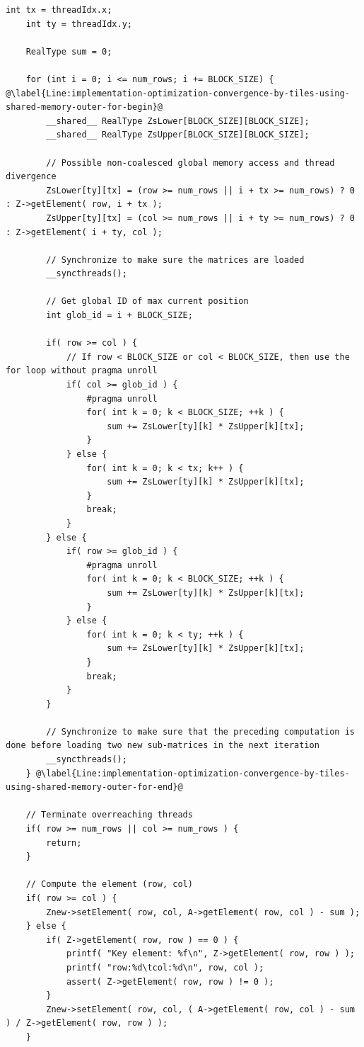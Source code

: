 \begin{lstlisting}[caption={Calculation of a single iteration of the GPU Iterative Crout method using logic from Listing~\ref{Listing:CUDA-matrix-multiplication-with-shared-memory-example}. Taken from the Decomposition project repository on GitLab\protect\footref{Footnote:decomposition-project-gitlab-url}.},label={Listing:implementation-optimization-convergence-by-tiles-using-shared-memory},escapechar=@]
	int tx = threadIdx.x;
	int ty = threadIdx.y;
	
	RealType sum = 0;
	
	for (int i = 0; i <= num_rows; i += BLOCK_SIZE) { @\label{Line:implementation-optimization-convergence-by-tiles-using-shared-memory-outer-for-begin}@
		__shared__ RealType ZsLower[BLOCK_SIZE][BLOCK_SIZE];
		__shared__ RealType ZsUpper[BLOCK_SIZE][BLOCK_SIZE];
		
		// Possible non-coalesced global memory access and thread divergence
		ZsLower[ty][tx] = (row >= num_rows || i + tx >= num_rows) ? 0 : Z->getElement( row, i + tx );
		ZsUpper[ty][tx] = (col >= num_rows || i + ty >= num_rows) ? 0 : Z->getElement( i + ty, col );
		
		// Synchronize to make sure the matrices are loaded
		__syncthreads();
		
		// Get global ID of max current position
		int glob_id = i + BLOCK_SIZE;
		
		if( row >= col ) {
			// If row < BLOCK_SIZE or col < BLOCK_SIZE, then use the for loop without pragma unroll
			if( col >= glob_id ) {
				#pragma unroll
				for( int k = 0; k < BLOCK_SIZE; ++k ) {
					sum += ZsLower[ty][k] * ZsUpper[k][tx];
				}
			} else {
				for( int k = 0; k < tx; k++ ) {
					sum += ZsLower[ty][k] * ZsUpper[k][tx];
				}
				break;
			}
		} else {
			if( row >= glob_id ) {
				#pragma unroll
				for( int k = 0; k < BLOCK_SIZE; ++k ) {
					sum += ZsLower[ty][k] * ZsUpper[k][tx];
				}
			} else {
				for( int k = 0; k < ty; ++k ) {
					sum += ZsLower[ty][k] * ZsUpper[k][tx];
				}
				break;
			}
		}
		
		// Synchronize to make sure that the preceding computation is done before loading two new sub-matrices in the next iteration
		__syncthreads();
	} @\label{Line:implementation-optimization-convergence-by-tiles-using-shared-memory-outer-for-end}@

	// Terminate overreaching threads
	if( row >= num_rows || col >= num_rows ) {
		return;
	}
	
	// Compute the element (row, col)
	if( row >= col ) {
		Znew->setElement( row, col, A->getElement( row, col ) - sum );
	} else {
		if( Z->getElement( row, row ) == 0 ) {
			printf( "Key element: %f\n", Z->getElement( row, row ) );
			printf( "row:%d\tcol:%d\n", row, col );
			assert( Z->getElement( row, row ) != 0 );
		}
		Znew->setElement( row, col, ( A->getElement( row, col ) - sum ) / Z->getElement( row, row ) );
	}
\end{lstlisting}

